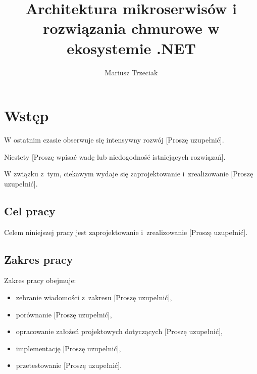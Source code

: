 \documentclass{PracaDyplomowa}
\author{Mariusz Trzeciak}
\title{Architektura mikroserwisów i rozwiązania chmurowe w ekosystemie .NET}
\begin{document}
\frontpage
\tableofcontents

\cleardoublepage %
\chapter*{Wstęp}


W ostatnim czasie obserwuje się intensywny rozwój [Proszę uzupełnić].

Niestety [Proszę wpisać wadę lub niedogodność istniejących rozwiązań].

W związku z~tym, ciekawym wydaje się zaprojektowanie i~zrealizowanie [Proszę uzupełnić].

\section*{Cel pracy}


Celem niniejszej pracy jest zaprojektowanie i~zrealizowanie [Proszę uzupełnić].

\section*{Zakres pracy}

Zakres pracy obejmuje:

\begin{itemize}
\item zebranie wiadomości z~zakresu [Proszę uzupełnić],

\item porównanie [Proszę uzupełnić],

\item opracowanie założeń projektowych dotyczących [Proszę uzupełnić],

\item implementację [Proszę uzupełnić],

\item przetestowanie [Proszę uzupełnić].
\end{itemize}
\end{document}
